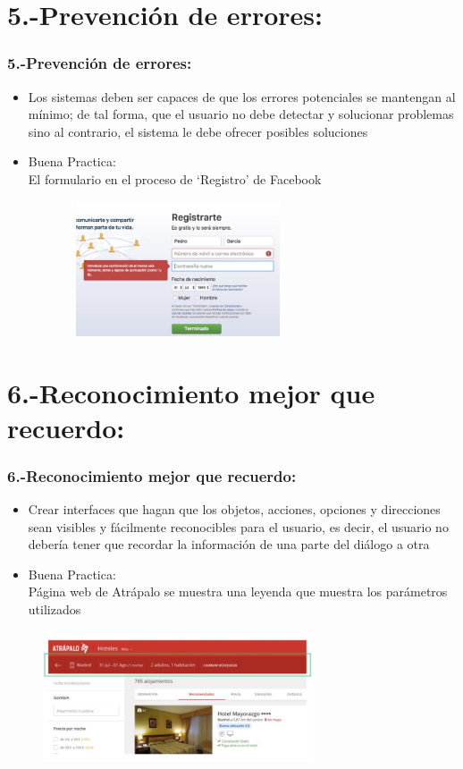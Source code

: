 \documentclass[11pt]{beamer}
\begin{document}
\section{5.-Prevención de errores:}
\begin{frame}
\frametitle{5.-Prevención de errores:}

\begin{itemize}
\item Los sistemas deben ser capaces de que los errores potenciales se mantengan al mínimo; de tal forma, que el usuario no debe detectar y solucionar problemas sino al contrario, el sistema le debe ofrecer posibles soluciones
\item Buena Practica:\\ El formulario en el
proceso de ‘Registro’ de Facebook
\end{itemize}

\begin{figure}
  \centering
  \includegraphics[width=8.0cm,height=4.0cm]{img/Imagen5.jpg}
\end{figure}
\end{frame}

\section{6.-Reconocimiento mejor que recuerdo:}
\begin{frame}
\frametitle{6.-Reconocimiento mejor que recuerdo:}

\begin{itemize}
\item Crear interfaces que hagan que los objetos, acciones, opciones y direcciones sean visibles y fácilmente reconocibles para el usuario, es decir, el usuario no debería tener que recordar la información de una parte del diálogo a otra
\item Buena Practica:\\ Página web de Atrápalo se muestra una leyenda que muestra los parámetros utilizados
\end{itemize}

\begin{figure}
  \centering
  \includegraphics[width=8.0cm,height=4.0cm]{img/Imagen6.jpg}
\end{figure}
\end{frame}
\end{document}
